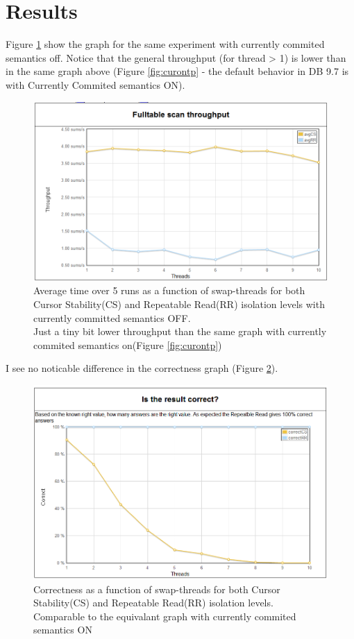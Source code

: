 \section{Results}
Figure \ref{fig:curofftp} show the graph for the same experiment with currently
commited semantics off. Notice that the general throughput (for thread > 1) is
lower than in the same graph above (Figure \ref{fig:curontp} - the default
behavior in DB 9.7 is with Currently Commited semantics ON).

\begin{figure}
  \centering
  \includegraphics[width=12cm]{assignment1/curoff_tp}
  \caption[Average time over 5 runs - new script, currently commited semantics
  off]{Average time over 5 runs as a function of
  swap-threads for both Cursor Stability(CS) and Repeatable Read(RR) isolation
  levels with currently committed semantics OFF.\\
  Just a tiny bit lower throughput than the same graph with currently commited
  semantics on(Figure \ref{fig:curontp})}\label{fig:curofftp}
\end{figure}

I see no noticable difference in the correctness graph (Figure
\ref{fig:curoffcorr}).

\begin{figure}
  \centering
  \includegraphics[width=12cm]{assignment1/curoff_corr}
  \caption[Correctness - new script,currently commited semantics off
  ]{Correctness as a function of
  swap-threads for both Cursor Stability(CS) and Repeatable Read(RR) isolation
  levels.\\ Comparable to the equivalant graph with currently commited
  semantics ON }\label{fig:curoffcorr}
\end{figure}


